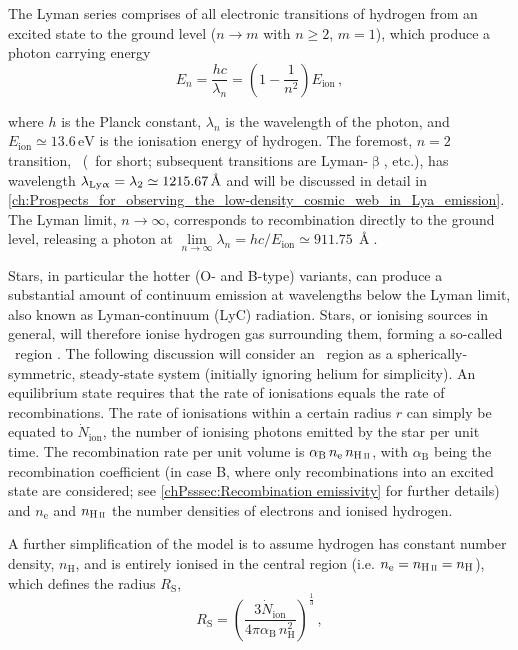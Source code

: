 The Lyman series comprises of all electronic transitions of hydrogen from an excited state to the ground level ($n \rightarrow m$ with $n \geq 2$, $m = 1$), which produce a photon carrying energy
\begin{equation}
    \label{chIeq:Lyman_series_energies}
    E_n = \frac{hc}{\lambda_n} = \left( 1 - \frac{1}{n^2} \right) E_\text{ion} \, ,
\end{equation}

\noindent where $h$ is the Planck constant, $\lambda_n$ is the wavelength of the photon, and $E_\text{ion} \simeq 13.6 \, \mathrm{eV}$ is the ionisation energy of hydrogen. The foremost, $n = 2$ transition, \lymana\ (\lya\ for short; subsequent transitions are Lyman-$\upbeta$, etc.), has wavelength $\lambda_\text{{Ly\ensuremath{\upalpha}}} = \lambda_2 \simeq 1215.67 \, \text{\AA}$ and will be discussed in detail in \cref{ch:Prospects_for_observing_the_low-density_cosmic_web_in_Lya_emission}. The Lyman limit, $n \rightarrow \infty$, corresponds to recombination directly to the ground level, releasing a photon at $\lim\limits_{n \rightarrow \infty} \lambda_n = hc/E_\text{ion} \simeq 911.75 \, \Angstrom$.

Stars, in particular the hotter (O- and B-type) variants, can produce a substantial amount of continuum emission at wavelengths below the Lyman limit, also known as Lyman-continuum (LyC) radiation. Stars, or ionising sources in general, will therefore ionise hydrogen gas surrounding them, forming a so-called \HII\ region \citep{1939ApJ....89..526S}. The following discussion will consider an \HII\ region as a spherically-symmetric, steady-state system (initially ignoring helium for simplicity). An equilibrium state requires that the rate of ionisations equals the rate of recombinations. The rate of ionisations within a certain radius $r$ can simply be equated to $\dot{N}_\text{ion}$, the number of ionising photons emitted by the star per unit time. The recombination rate per unit volume is $\alpha_\text{B} \, n_\text{e} \, n_\text{\HII}$, with $\alpha_\text{B}$ being the recombination coefficient (in case B, where only recombinations into an excited state are considered; see \cref{chPsssec:Recombination emissivity} for further details) and $n_\text{e}$ and $n_\text{\HII}$ the number densities of electrons and ionised hydrogen.

A further simplification of the model is to assume hydrogen has constant number density, $n_\text{H}$, and is entirely ionised in the central region (i.e. $n_\text{e} = n_\text{\HII} = n_\text{H}$), which defines the \citeauthor{1939ApJ....89..526S} radius $R_\text{S}$,
\begin{equation}
    \label{chIeq:Photoionisation_equilibrium}
    R_\text{S} = \left( \frac{3 \dot{N}_\text{ion}}{4 \pi \alpha_\text{B} \, n_\text{H}^2} \right)^\frac{1}{3} \, ,
\end{equation}

